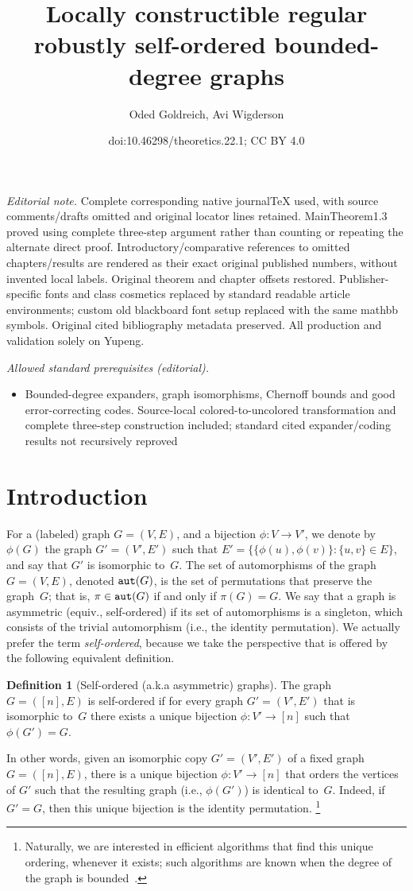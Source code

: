 \documentclass[10pt,a4paper]{article}
\title{Locally constructible regular robustly self-ordered bounded-degree graphs}
\author{Oded Goldreich, Avi Wigderson}
\date{doi:10.46298/theoretics.22.1; CC BY 4.0}
\theoremstyle{definition}
\newtheorem{definition}[theorem]{Definition}
\newcommand{\BD}{\begin{definition}}   \newcommand{\ED}{\end{definition}}
\begin{document}
\maketitle
\noindent\textit{Editorial note.} Complete corresponding native journalTeX used, with source comments/drafts omitted and original locator lines retained. MainTheorem1.3 proved using complete three-step argument rather than counting or repeating the alternate direct proof. Introductory/comparative references to omitted chapters/results are rendered as their exact original published numbers, without invented local labels. Original theorem and chapter offsets restored. Publisher-specific fonts and class cosmetics replaced by standard readable article environments; custom old blackboard font setup replaced with the same mathbb symbols. Original cited bibliography metadata preserved. All production and validation solely on Yupeng.\par\medskip
\noindent\textit{Allowed standard prerequisites (editorial).}\begin{itemize}
\item Bounded-degree expanders, graph isomorphisms, Chernoff bounds and good error-correcting codes. Source-local colored-to-uncolored transformation and complete three-step construction included; standard cited expander/coding results not recursively reproved
\end{itemize}\medskip
\section{Introduction}
For a (labeled) graph $G=(V,E)$, and a bijection $\phi:V\to V'$,
we denote by $\phi(G)$ the graph $G'=(V',E')$
such that $E'=\{\{\phi(u),\phi(v)\}:\{u,v\}\!\in\!E\}$,
and say that $G'$ is {\sf isomorphic} to~$G$.
The set of {\sf automorphisms} of the graph $G=(V,E)$,
denoted ${\tt aut}(G)$,
is the set of permutations that preserve the graph~$G$;
that is, $\pi\in{\tt aut}(G)$ if and only if $\pi(G)=G$.
We say that a graph is {\sf asymmetric} (equiv., {\sf self-ordered})
if its set of automorphisms is a singleton,
which consists of the trivial automorphism
(i.e., the identity permutation).
We actually prefer the term {\em self-ordered}, because we take
the perspective that is offered by the following equivalent definition.

%
\BD[Self-ordered (a.k.a asymmetric) graphs]
\label{asymmetric:def}
%
The graph $G=([n],E)$ is {\sf self-ordered}
if for every graph $G'=(V',E')$ that is isomorphic to~$G$
there exists a unique bijection $\phi:V'\to[n]$ such that $\phi(G')=G$.
\ED
In other words,
given an isomorphic copy $G'=(V',E')$ of a fixed graph $G=([n],E)$,
there is a unique bijection $\phi:V'\to[n]$ that orders the vertices of $G'$
such that the resulting graph (i.e., $\phi(G')$) is identical to~$G$.
Indeed, if $G'=G$, then this unique bijection is the identity permutation.
\footnote{Naturally, we are interested in efficient algorithms
that find this unique ordering, whenever it exists;
such algorithms are known
when the degree of the graph is bounded~\cite{L}.}
\end{document}
